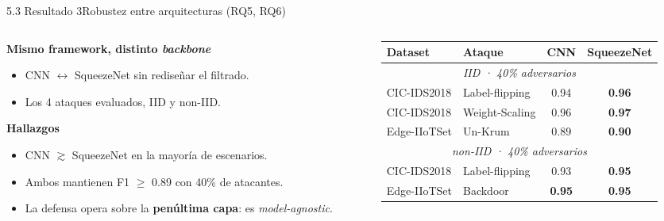 \begin{frame}{5.3 Resultado 3}{Robustez entre arquitecturas (RQ5, RQ6)}
  \begin{columns}[T]
    \begin{column}{0.5\textwidth}
      \textbf{Mismo framework, distinto \textit{backbone}}\\[0.3em]
      \begin{itemize}\small
        \item CNN $\leftrightarrow$ SqueezeNet sin rediseñar el filtrado.
        \item Los 4 ataques evaluados, IID y non-IID.
      \end{itemize}
      \vfill
      \textbf{Hallazgos}
      \begin{itemize}\small
        \item CNN $\gtrsim$ SqueezeNet en la mayoría de escenarios.
        \item Ambos mantienen F1 $\geq$ 0.89 con 40\% de atacantes.
        \item La defensa opera sobre la \textbf{penúltima capa}: es \textit{model-agnostic}.
      \end{itemize}
    \end{column}
    \begin{column}{0.5\textwidth}
      \centering
      \scriptsize
      \begin{tabular}{@{}llcc@{}}
        \toprule
        \textbf{Dataset} & \textbf{Ataque} & \textbf{CNN} & \textbf{SqueezeNet} \\
        \midrule
        \multicolumn{4}{c}{\textit{IID · 40\% adversarios}} \\
        \midrule
        CIC-IDS2018  & Label-flipping & 0.94 & \textbf{0.96} \\
        CIC-IDS2018  & Weight-Scaling & 0.96 & \textbf{0.97} \\
        Edge-IIoTSet & Un-Krum        & 0.89 & \textbf{0.90} \\
        \midrule
        \multicolumn{4}{c}{\textit{non-IID · 40\% adversarios}} \\
        \midrule
        CIC-IDS2018  & Label-flipping & 0.93 & \textbf{0.95} \\
        Edge-IIoTSet & Backdoor       & \textbf{0.95} & \textbf{0.95} \\
        \bottomrule
      \end{tabular}
    \end{column}
  \end{columns}
\end{frame}

